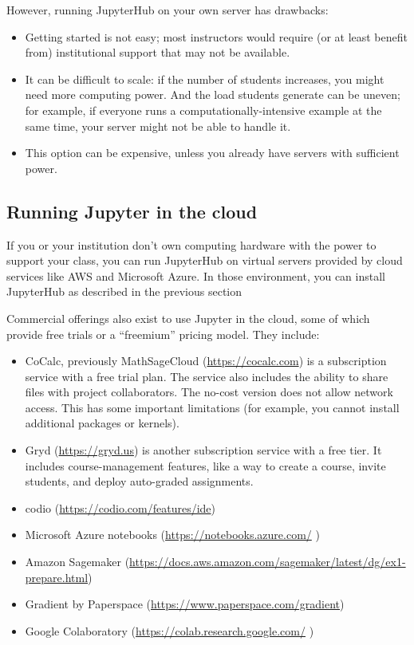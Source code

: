 \documentclass[]{book}
\begin{document}
However, running JupyterHub on your own server has drawbacks:

\begin{itemize}
\item
  Getting started is not easy; most instructors would require (or at
  least benefit from) institutional support that may not be available.
\item
  It can be difficult to scale: if the number of students increases, you
  might need more computing power. And the load students generate can be
  uneven; for example, if everyone runs a computationally-intensive
  example at the same time, your server might not be able to handle it.
\item
  This option can be expensive, unless you already have servers with
  sufficient power.
\end{itemize}

\subsection{Running Jupyter in the
cloud}\label{running-jupyter-in-the-cloud}

If you or your institution don't own computing hardware with the power
to support your class, you can run JupyterHub on virtual servers
provided by cloud services like AWS and Microsoft Azure. In those
environment, you can install JupyterHub as described in the previous
section

Commercial offerings also exist to use Jupyter in the cloud, some of
which provide free trials or a ``freemium'' pricing model. They include:

\begin{itemize}
\item
  CoCalc, previously MathSageCloud (\url{https://cocalc.com}) is a
  subscription service with a free trial plan. The service also includes
  the ability to share files with project collaborators. The no-cost
  version does not allow network access. This has some important
  limitations (for example, you cannot install additional packages or
  kernels).
\item
  Gryd (\url{https://gryd.us}) is another subscription service with a
  free tier. It includes course-management features, like a way to
  create a course, invite students, and deploy auto-graded assignments.
\item
  codio (\url{https://codio.com/features/ide})
\item
  Microsoft Azure notebooks (\url{https://notebooks.azure.com/} )
\item
  Amazon Sagemaker
  (\url{https://docs.aws.amazon.com/sagemaker/latest/dg/ex1-prepare.html})
\item
  Gradient by Paperspace (\url{https://www.paperspace.com/gradient})
\item
  Google Colaboratory (\url{https://colab.research.google.com/} )
\end{itemize}
\end{document}
